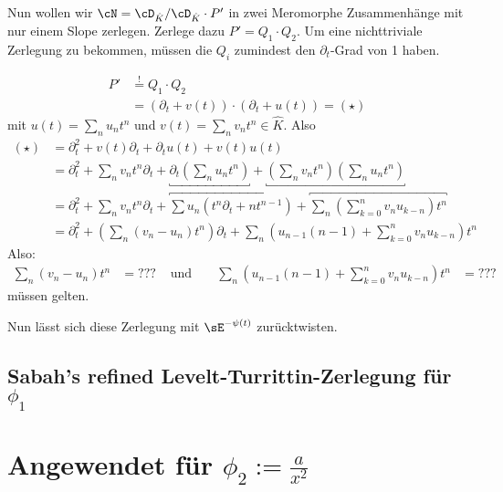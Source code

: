 Nun wollen wir $\cN=\cD_{\hat K}/\cD_{\hat K}\cdot P'$ in zwei Meromorphe
Zusammenhänge mit nur einem Slope zerlegen. Zerlege dazu $P'=Q_1\cdot Q_2$. Um
eine nichttriviale Zerlegung zu bekommen, müssen die $Q_i$ zumindest den
$\partial_t$-Grad von 1 haben.
\begin{comment}
in \cite[Lem 1.14.]{ZulaBarbara} steht die obere schranke
\end{comment}
\begin{align*}
P'&\overset{!}{=} Q_1\cdot Q_2
\\&= (\partial_t+v(t))\cdot(\partial_t+u(t))=(\star)
\end{align*}
mit $u(t)=\sum_n u_nt^n$ und $v(t)=\sum_n v_nt^n \in \hat K$. Also
\begin{align*}
(\star)&= \partial_t^2+v(t)\partial_t + \partial_t u(t)+v(t)u(t)
\\&= \partial_t^2 + \sum_n v_nt^n\partial_t
  + \underbracket{\partial_t (\sum_n u_nt^n)}
  + \underbracket{(\sum_n v_nt^n)(\sum_n u_nt^n)}
\\&= \partial_t^2 +  \sum_n v_nt^n\partial_t
  + \overbracket{\sum u_n(t^n\partial_t+nt^{n-1})}
  + \overbracket{\sum_n(\sum_{k=0}^nv_nu_{k-n})t^n}
\\&= \partial_t^2 +  (\sum_n (v_n-u_n)t^n )\partial_t
  + \sum_n(u_{n-1}(n-1)+\sum_{k=0}^nv_nu_{k-n})t^n
\end{align*}
Also:
\begin{align*}
\sum_n (v_n-u_n)t^n&=???
&\mbox{ und } &&
\sum_n(u_{n-1}(n-1)+\sum_{k=0}^nv_nu_{k-n})t^n&=???
\end{align*}
müssen gelten.

Nun lässt sich diese Zerlegung mit $\sE^{-\psi(t)}$ zurücktwisten.

\subsection{Sabah's refined Levelt-Turrittin-Zerlegung für $\phi_1$}

\section{Angewendet für $\phi_2:=\frac{a}{x^2}$}

